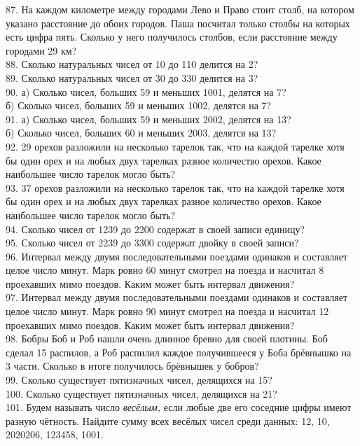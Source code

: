 87. На каждом километре между городами Лево и Право стоит столб, на котором указано расстояние до обоих городов. Паша посчитал только столбы на которых есть цифра пять. Сколько у него получилось столбов, если расстояние между городами 29 км?\\
88. Сколько натуральных чисел от 10 до 110 делится на 2?\\
89. Сколько натуральных чисел от 30 до 330 делится на 3?\\
90. а) Сколько чисел, больших 59 и меньших 1001, делятся на 7?\\
б) Сколько чисел, больших 59 и меньших 1002, делятся на 7?\\
91. а) Сколько чисел, больших 59 и меньших 2002, делятся на 13?\\
б) Сколько чисел, больших 60 и меньших 2003, делятся на 13?\\
92. 29 орехов разложили на несколько тарелок так, что на каждой тарелке хотя бы один орех и на любых двух тарелках разное количество орехов. Какое наибольшее число тарелок могло быть?\\
93. 37 орехов разложили на несколько тарелок так, что на каждой тарелке хотя бы один орех и на любых двух тарелках разное количество орехов. Какое наибольшее число тарелок могло быть?\\
94. Сколько чисел от 1239 до 2200 содержат в своей записи единицу?\\
95. Сколько чисел от 2239 до 3300 содержат двойку в своей записи?\\
96. Интервал между двумя последовательными поездами одинаков и составляет целое число минут. Марк ровно 60 минут смотрел на поезда и насчитал 8 проехавших мимо поездов. Каким может быть интервал движения?\\
97. Интервал между двумя последовательными поездами одинаков и составляет целое число минут. Марк ровно 90 минут смотрел на поезда и насчитал 12 проехавших мимо поездов. Каким может быть интервал движения?\\
98. Бобры Боб и Роб нашли очень длинное бревно для своей плотины. Боб сделал 15 распилов, а Роб распилил каждое получившееся у Боба брёвнышко на 3 части. Сколько в итоге получилось брёвнышек у бобров?\\
99. Сколько существует пятизначных чисел, делящихся на 15?\\
100. Сколько существует пятизначных чисел, делящихся на 21?\\
101. Будем называть число {\it весёлым,} если любые две его соседние цифры имеют разную чётность. Найдите сумму всех весёлых чисел среди данных: 12, 10, 2020206, 123458, 1001.\\
